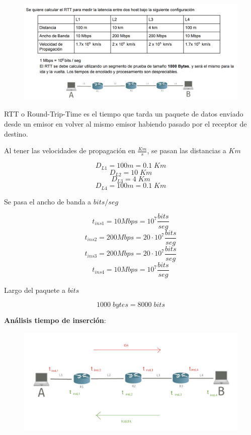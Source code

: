 \documentclass[titlepage,a4paper]{article}
\begin{document}
\begin{figure}[H]
\centering
\includegraphics[width=\textwidth]{imagenes/ejercicioRtt.png}
\end{figure}


RTT o Round-Trip-Time es el tiempo que tarda un paquete de datos enviado desde un emisor en volver
al mismo emisor habiendo pasado por el receptor de destino.

Al tener las velocidades de propagación en $\frac{Km}{s}$, se pasan las distancias a $Km$

$$D_{L1} = 100 m = 0.1 \; Km$$
$$D_{L2} = 10 \; Km$$
$$D_{L3} = 4 \; Km$$
$$D_{L4} = 100 m = 0.1 \; Km$$

Se pasa el ancho de banda a $bits/seg$

$$t_{ins1} = 10 Mbps = 10^7 \frac{bits}{seg}$$
$$t_{ins2} = 200 Mbps = 20\cdot 10^7 \frac{bits}{seg}$$
$$t_{ins3} = 200 Mbps = 20\cdot 10^7 \frac{bits}{seg}$$
$$t_{ins4} = 10 Mbps = 10^7 \frac{bits}{seg}$$

Largo del paquete a $bits$

$$1000 \; bytes = 8000 \; bits$$

\textbf{Análisis tiempo de inserción}: \\


\begin{figure}[H]
\centering
\includegraphics[width=\textwidth]{imagenes/tiempoInsercion.png}
\end{figure}
\end{document}

